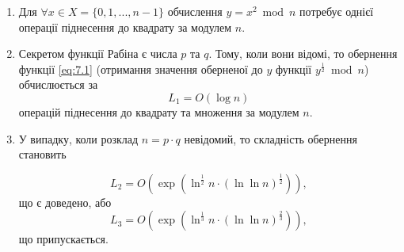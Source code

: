\begin{enumerate}

\item Для $\forall x \in X = \{ 0, 1, ..., n-1 \}$ обчислення $y = x ^{2} \bmod n$ потребує однієї операції піднесення до квадрату за модулем $n$.
\item Секретом функції Рабіна є числа $p$ та $q$. Тому, коли вони відомі, то обернення функції \eqref{eq:7.1} (отримання значення оберненої до $y$ функції $y ^{\frac{1}{2}} \bmod n$) обчислюється за
\begin{equation} \label{eq:7.2} 
L_1 = O(\log{n})
\end{equation}
операцій піднесення до квадрату та множення за модулем $n$.
\item У випадку, коли розклад $n = p \cdot q$ невідомий, то складність обернення становить

\begin{equation} \label{eq:7.3}
L_2 = O(\exp{(\ln^{\frac{1}{2}}n \cdot (\ln{\ln{n}})^{\frac{1}{2}})}),
\end{equation}
що є доведено, або
\begin{equation} \label{eq:7.4}
L_3 = O(\exp{(\ln^{\frac{1}{3}}n \cdot (\ln{\ln{n}})^{\frac{2}{3}})}),
\end{equation}
що припускається.

\end{enumerate}

